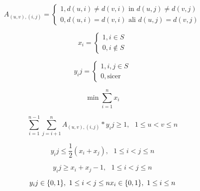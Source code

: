 \documentclass[a4paper,10pt, fleqn]{article}
\begin{document}
\begin{equation}
    A_{(u, v), (i, j)} = \begin{cases}
        1, d(u, i) \neq d(v, i) \text{ in } d(u, j) \neq d(v, j) \\
        0, d(u, i) = d(v, i) \text{ ali } d(u, j) = d(v, j)
    \end{cases}
\label{eq:1}
\end{equation}

\begin{equation}
    x_i = \begin{cases}
        1, i \in S \\
        0, i \notin S
    \end{cases}
\label{eq:2}
\end{equation} %

\begin{equation}
    y_ij = \begin{cases}
        1, i, j \in S \\
        0, \text{sicer}
    \end{cases}
\label{eq:3}
\end{equation}

\begin{equation}
    \min \sum_{i = 1}^{n} x_i  
\label{eq:4}
\end{equation}

\begin{equation}
    \sum_{i = 1}^{n - 1} \sum_{j = i + 1}^{n} A_{(u, v), (i, j)} * y_ij \geq 1,
    \text{ } 1 \leq u < v \leq n
\label{eq:5}
\end{equation}

\begin{equation}
    y_ij \leq \frac{1}{2} (x_i + x_j), \text{ } 1 \leq i < j \leq n
\label{eq:6}
\end{equation}

\begin{equation}
    y_ij \geq x_i + x_j - 1, \text{ } 1 \leq i < j \leq n
\label{eq:7}
\end{equation}

\begin{equation}
    y_ij \in \{0, 1\}, \text{ } 1 \leq i < j \leq n \\
    x_i \in \{0, 1\}, \text{ } 1 \leq i \leq n
\label{qe:8}
\end{equation}
\end{document}

